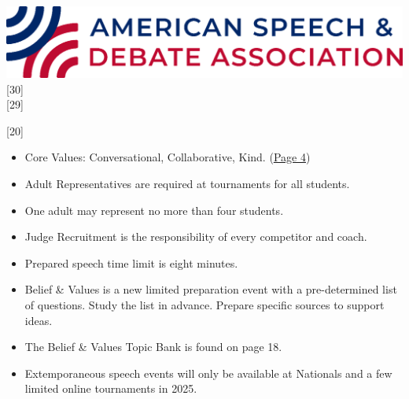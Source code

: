 \documentclass[11pt]{memoir}    %
\def\lowspacing{9pt}
\def\regspacing{19pt}
\def\hispacing{20pt}
\begin{document}
\thispagestyle{CoverStyle}
\addtocounter{page}{-1}

\begin{center}
    \begin{vplace}[0.4]
        \includegraphics[width=0.9815\linewidth,keepaspectratio]{Images/TitlePageLogo.png}\vspace{\hispacing}
        [30]\vspace{\lowspacing}\\
        [29]
    \end{vplace}
\end{center}

\newpage


[20]



\begin{itemize}
    \item Core Values: Conversational, Collaborative, Kind. (\textcolor{blue}{\uline{\hyperref[subsec:CoreValues]{Page 4}}})
    \item Adult Representatives are required at tournaments for all students.
    \item One adult may represent no more than four students.
    \item Judge Recruitment is the responsibility of every competitor and coach.
\end{itemize}\vspace{\regspacing}


\begin{itemize}
    \item Prepared speech time limit is eight minutes.
    \item Belief \& Values is a new limited preparation event with a pre-determined list of questions. Study the list in advance. Prepare specific sources to support ideas.
    \item The Belief \& Values Topic Bank is found on page 18.
    \item Extemporaneous speech events will only be available at Nationals and a few limited online tournaments in 2025.
\end{itemize}\vspace{\regspacing}
\end{document}
